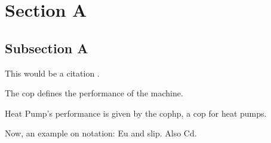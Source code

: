 \section{Section A}
\label{sec:sectiona}

\subsection{Subsection A}
\label{subsec:subasectionA}

This would be a citation \cite{dummy}.

The \gls{cop} defines the performance of the machine.

Heat Pump's performance is given by the \gls{cophp}, a \gls{cop} for heat pumps.

Now, an example on notation: \gls{Eu} and \gls{slip}.
Also \gls{Cd}.
